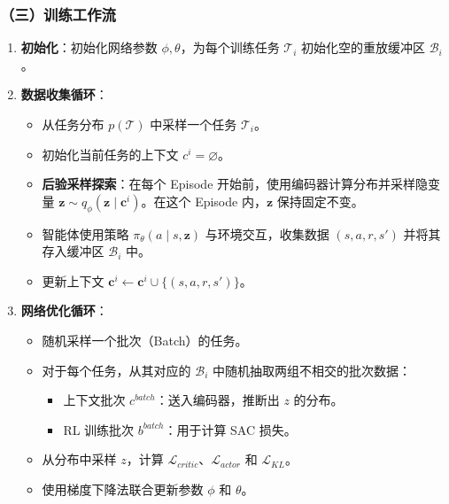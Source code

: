 \hypertarget{ux4e09ux8badux7ec3ux5de5ux4f5cux6d41-1}{%
\subsubsection{（三）训练工作流}\label{ux4e09ux8badux7ec3ux5de5ux4f5cux6d41-1}}

\begin{enumerate}
\def\labelenumi{\arabic{enumi}.}
\tightlist
\item
  \textbf{初始化}：初始化网络参数 \(\phi,\theta\)，为每个训练任务 \(\mathcal{T}_i\) 初始化空的重放缓冲区 \(\mathcal{B}_i\)。
\item
  \textbf{数据收集循环}：

  \begin{itemize}
  \tightlist
  \item
    从任务分布 \(p(\mathcal{T})\) 中采样一个任务 \(\mathcal{T}_i\)。
  \item
    初始化当前任务的上下文 \(c^i=\varnothing\)。
  \item
    \textbf{后验采样探索}：在每个 Episode 开始前，使用编码器计算分布并采样隐变量 \(\mathbf{z}\sim q_{\phi}(\mathbf{z}\mid\mathbf{c}^i)\)。在这个 Episode 内，\(\mathbf{z}\) 保持固定不变。
  \item
    智能体使用策略 \(\pi_{\theta}(a\mid s,\mathbf{z})\) 与环境交互，收集数据 \((s,a,r,s')\) 并将其存入缓冲区 \(\mathcal{B}_i\) 中。
  \item
    更新上下文 \(\mathbf{c}^i\leftarrow\mathbf{c}^i\cup\{(s,a,r,s')\}\)。
  \end{itemize}
\item
  \textbf{网络优化循环}：

  \begin{itemize}
  \tightlist
  \item
    随机采样一个批次（Batch）的任务。
  \item
    对于每个任务，从其对应的 \(\mathcal{B}_i\) 中随机抽取两组不相交的批次数据：

    \begin{itemize}
    \tightlist
    \item
      上下文批次 \(c^{batch}\)：送入编码器，推断出 \(z\) 的分布。
    \item
      RL 训练批次 \(b^{batch}\)：用于计算 SAC 损失。
    \end{itemize}
  \item
    从分布中采样 \(z\)，计算 \(\mathcal{L}_{critic}\)、\(\mathcal{L}_{actor}\) 和 \(\mathcal{L}_{KL}\)。
  \item
    使用梯度下降法联合更新参数 \(\phi\) 和 \(\theta\)。
  \end{itemize}
\end{enumerate}

